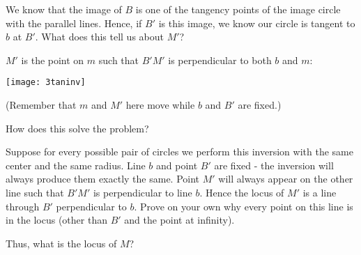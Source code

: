 
We know that the image of $B$ is one of the tangency points of the image circle with the parallel lines.  Hence, if $B'$ is this image, we know our circle is tangent to $b$ at $B'$.  What does this tell us about $M'$?

$M'$ is the point on $m$ such that $B'M'$ is perpendicular to both $b$ and $m$:

\begin{center}
    \texttt{[image: 3taninv]}    
\end{center}

(Remember that $m$ and $M'$ here move while $b$ and $B'$ are fixed.)

How does this solve the problem?

Suppose for every possible pair of circles we perform this inversion with the same center and the same radius.  Line $b$ and point $B'$ are fixed - the inversion will always produce them exactly the same.  Point $M'$ will always appear on the other line such that $B'M'$ is perpendicular to line $b$.  Hence the locus of $M'$ is a line through $B'$ perpendicular to $b$.  Prove on your own why every point on this line is in the locus (other than $B'$ and the point at infinity).

Thus, what is the locus of $M$?







